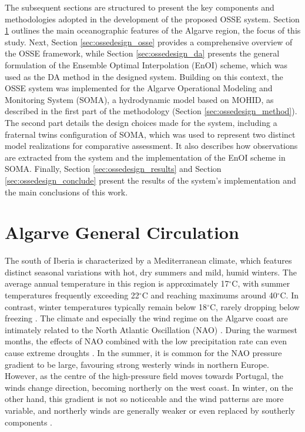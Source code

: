 The subsequent sections are structured to present the key components and methodologies adopted in the development of the proposed OSSE system. Section \ref{sec:ossedesign_algarve} outlines the main oceanographic features of the Algarve region, the focus of this study. Next, Section \ref{sec:ossedesign_osse} provides a comprehensive overview of the OSSE framework, while Section \ref{sec:ossedesign_da} presents the general formulation of the Ensemble Optimal Interpolation (EnOI) scheme, which was used as the DA method in the designed system. Building on this context, the OSSE system was implemented for the Algarve Operational Modeling and Monitoring System (SOMA), a hydrodynamic model based on MOHID, as described in the first part of the methodology (Section \ref{sec:ossedesign_method}). The second part details the design choices made for the system, including a fraternal twins configuration of SOMA, which was used to represent two distinct model realizations for comparative assessment. It also describes how observations are extracted from the system and the implementation of the EnOI scheme in SOMA. Finally, Section \ref{sec:ossedesign_results} and Section \ref{sec:ossedesign_conclude} present the results of the system's implementation and the main conclusions of this work.

\section{Algarve General Circulation} \label{sec:ossedesign_algarve}
The south of Iberia is characterized by a Mediterranean climate, which features distinct seasonal variations with hot, dry summers and mild, humid winters. The average annual temperature in this region is approximately 17$^\circ$C, with summer temperatures frequently exceeding 22$^\circ$C and reaching maximums around 40$^\circ$C. In contrast, winter temperatures typically remain below 18$^\circ$C, rarely dropping below freezing \parencite{beck2018present}. The climate and especially the wind regime on the Algarve coast are intimately related to the North Atlantic Oscillation (NAO) \parencite{leitao2018northerly, hurrell2010north}. During the warmest months, the effects of NAO combined with the low precipitation rate can even cause extreme droughts \parencite{dias2020intefrating, santos2010spatial}. In the summer, it is common for the NAO pressure gradient to be large, favouring strong westerly winds in northern Europe. However, as the centre of the high-pressure field moves towards Portugal, the winds change direction, becoming northerly on the west coast. In winter, on the other hand, this gradient is not so noticeable and the wind patterns are more variable, and northerly winds are generally weaker or even replaced by southerly components \parencite{fiuza1982climatological}.

